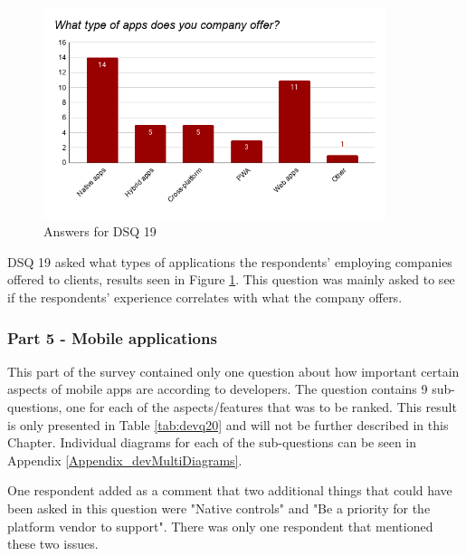 \documentclass[a4paper,12pt]{article}
\renewcommand{\arraystretch}{1.5}
\begin{document}
\begin{figure}[ht!]
    \centering
    \includegraphics[width=10cm]{img/Results/dsq19.png}
    \caption{Answers for DSQ 19}
    \label{fig:res_devq19}
\end{figure}

DSQ 19 asked what types of applications the respondents' employing companies offered to clients, results seen in Figure \ref{fig:res_devq19}. This question was mainly asked to see if the respondents' experience correlates with what the company offers.

\subsubsection{Part 5 - Mobile applications}
\label{Results_dev_part5}
This part of the survey contained only one question about how important certain aspects of mobile apps are according to developers. The question contains 9 sub-questions, one for each of the aspects/features that was to be ranked. This result is only presented in Table \ref{tab:devq20} and will not be further described in this Chapter. Individual diagrams for each of the sub-questions can be seen in Appendix \ref{Appendix_devMultiDiagrams}.

One respondent added as a comment that two additional things that could have been asked in this question were "Native controls" and "Be a priority for the platform vendor to support". There was only one respondent that mentioned these two issues.

\setlength{\parindent}{0pt}
\setlength{\arrayrulewidth}{0.4mm}
\setlength{\tabcolsep}{4pt}
\renewcommand{\arraystretch}{1.5}
\end{document}
